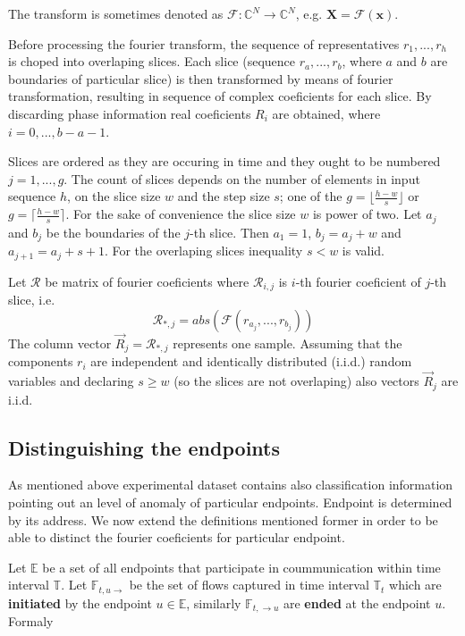 \documentclass[a4paper,journal]{IEEEtran}
\begin{document}
The transform is sometimes denoted as 
$\mathcal{F}\colon\mathbb{C}^N \to \mathbb{C}^N$, e.g.
$\mathbf{X} = \mathcal{F} \left ( \mathbf{x} \right )$.

Before processing the fourier transform, the sequence of representatives 
$r_1, ...,r_h$ is choped into overlaping slices.
Each slice (sequence $r_a, ..., r_b$, where $a$ and $b$ are boundaries
of particular slice) is then transformed by means of fourier transformation,
resulting in sequence of complex coeficients for each slice.
By discarding phase information real coeficients ${R}_i$ are obtained,
where $i = 0, ..., b-a-1$.

Slices are ordered as they are occuring in time and they ought to be numbered
$j = 1,..., g $. The count of slices  depends on the number of elements 
in input sequence $h$, on the slice size $w$ and the step size $s$; one of the
$g=\lfloor\frac{h-w}{s} \rfloor$ or $g=\lceil\frac{h-w}{s} \rceil$.
For the sake of convenience the slice size $w$ is power of two.
Let $a_j$ and $b_j$ be the boundaries of the $j$-th slice. Then
$a_1 = 1$, $b_j = a_j + w$ and $a_{j+1} = a_j + s +1$.
For the overlaping slices inequality $s < w$ is valid.

Let $\mathcal{R}$ be matrix of fourier coeficients where
$\mathcal{R}_{i,j}$ is $i$-th fourier coeficient of $j$-th slice,
i.e. 
\begin{equation}
\mathcal{R}_{*,j} = abs(\mathcal{F}(r_{a_j}, ..., r_{b_j}))
\end{equation}
The column vector $\vec R_j = \mathcal{R}_{*,j}$ represents one sample. 
Assuming that the components $r_i$ are independent and identically distributed (i.i.d.) random variables
and declaring $ s \ge w $ (so the slices are not overlaping) also vectors $\vec{R}_j$ are i.i.d.

\subsection{Distinguishing the endpoints}
As mentioned above experimental dataset contains also
classification information pointing out an level of anomaly of 
particular endpoints. Endpoint is determined by its address.
We now extend the definitions mentioned
former in order to be able to distinct the fourier coeficients for
particular endpoint.

Let $\mathbb{E}$ be a set of all endpoints that
participate in coummunication within time interval $\mathbb{T}$.
Let $\mathbb{F}_{t,u \rightarrow}$ be the set of flows captured in
time interval $\mathbb{T}_{t}$ %
which are \textbf{initiated} by the endpoint $u \in \mathbb{E}$,
similarly $\mathbb{F}_{t, \rightarrow u}$ are \textbf{ended} at the
endpoint $u$. Formaly
\end{document}
